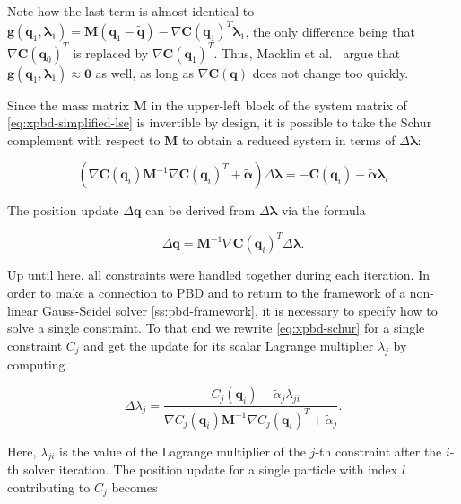 \noindent Note how the last term is almost identical to $\bm{g}(\bm{q}_1, \bm{\lambda}_1) = \bm{M}(\bm{q}_1 - \bm{\tilde{q}}) - \nabla 
\bm{C}(\bm{q}_1)^T \bm{\lambda}_1$, the only difference being that $\nabla \bm{C}(\bm{q}_0)^T$ is replaced by $\nabla \bm{C}(\bm{q}_1)^T$. Thus, 
Macklin et al.\ \cite{macklin2016} argue that $\bm{g}(\bm{q}_1, \bm{\lambda}_1) \approx \bm{0}$ as well, as long as $\nabla \bm{C}(\bm{q})$ 
does not change too quickly.

Since the mass matrix $\bm{M}$ in the upper-left block of the system matrix of \cref{eq:xpbd-simplified-lse} is invertible by design, it is possible
to take the Schur complement with respect to $\bm{M}$ to obtain a reduced system in terms of $\Delta \bm{\lambda}$:

\begin{equation}\label{eq:xpbd-schur}
    (\nabla \bm{C}(\bm{q}_i) \bm{M}^{-1} \nabla \bm{C}(\bm{q}_i)^T + \bm{\tilde{\alpha}}) \Delta \bm{\lambda} = -\bm{C}(\bm{q}_i) - 
    \bm{\tilde{\alpha}}\bm{\lambda}_i
\end{equation}

\noindent The position update $\Delta \bm{q}$ can be derived from $\Delta \bm{\lambda}$ via the formula

\begin{equation}\label{eq:xpbd-position-update}
    \Delta \bm{q} = \bm{M}^{-1} \nabla \bm{C}(\bm{q}_i)^T \Delta \bm{\lambda}.
\end{equation}

Up until here, all constraints were handled together during each iteration. In order to make a connection to PBD and to return to the framework of a
non-linear Gauss-Seidel solver \cref{ss:pbd-framework}, it is necessary to specify how to solve a single constraint. To that end we rewrite 
\cref{eq:xpbd-schur} for a single constraint $C_j$ and get the update for its scalar Lagrange multiplier $\lambda_j$ by computing

\begin{equation}\label{eq:xpbd-lambda-j}
    \Delta \lambda_j = \frac{-C_j(\bm{q}_i) - \tilde{\alpha}_j \lambda_{ji}}{\nabla C_j(\bm{q}_i) \bm{M}^{-1} \nabla C_j(\bm{q}_i)^T + \tilde{\alpha}_j}.
\end{equation}

\noindent Here, $\lambda_{ji}$ is the value of the Lagrange multiplier of the $j$-th constraint after the $i$-th solver iteration. The position update for 
a single particle with index $l$ contributing to $C_j$ becomes

